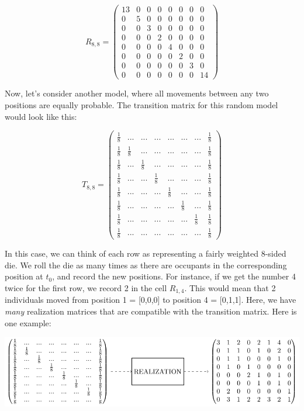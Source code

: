 \documentclass[
  11pt,
]{article}
\begin{document}
\[
R_{8,8} =
\begin{pmatrix}
13 & 0 & 0 & 0 & 0 & 0 & 0 & 0  \\
0 & 5 & 0 & 0 & 0 & 0 & 0 & 0   \\
0 & 0 & 3 & 0 & 0 & 0 & 0 & 0   \\
0 & 0 & 0 & 2 & 0 & 0 & 0 & 0   \\
0 & 0 & 0 & 0 & 4 & 0 & 0 & 0   \\
0 & 0 & 0 & 0 & 0 & 2 & 0 & 0   \\
0 & 0 & 0 & 0 & 0 & 0 & 3 & 0   \\
0 & 0 & 0 & 0 & 0 & 0 & 0 & 14 
\end{pmatrix}
\]

Now, let's consider another model, where all movements between any two
positions are equally probable. The transition matrix for this random
model would look like this:

\[
T_{8,8} =
\begin{pmatrix}
\frac{1}{8} & ... & ... & ... & ... & ... & ... & \frac{1}{8}           \\
\frac{1}{8} & \frac{1}{8} & ... & ... & ... & ... & ... & \frac{1}{8}   \\
\frac{1}{8} & ... & \frac{1}{8} & ... & ... & ... & ... & \frac{1}{8}   \\
\frac{1}{8} & ... & ... & \frac{1}{8} & ... & ... & ... & \frac{1}{8}   \\
\frac{1}{8} & ... & ... & ... & \frac{1}{8} & ... & ... & \frac{1}{8}   \\
\frac{1}{8} & ... & ... & ... & ... & \frac{1}{8} & ... & \frac{1}{8}   \\
\frac{1}{8} & ... & ... & ... & ... & ... & \frac{1}{8} & \frac{1}{8}   \\
\frac{1}{8} & ... & ... & ... & ... & ... & ... & \frac{1}{8} 
\end{pmatrix}
\]

In this case, we can think of each row as representing a fairly weighted
8-sided die. We roll the die as many times as there are occupants in the
corresponding position at \(t_0\), and record the new positions. For
instance, if we get the number 4 twice for the first row, we record 2 in
the cell \(R_{1,4}\). This would mean that 2 individuals moved from
position 1 = {[}0,0,0{]} to position 4 = {[}0,1,1{]}. Here, we have
\emph{many} realization matrices that are compatible with the transition
matrix. Here is one example:

\begin{center}\includegraphics{manuscript_files/figure-latex/tikz-ex-1} \end{center}
\end{document}
